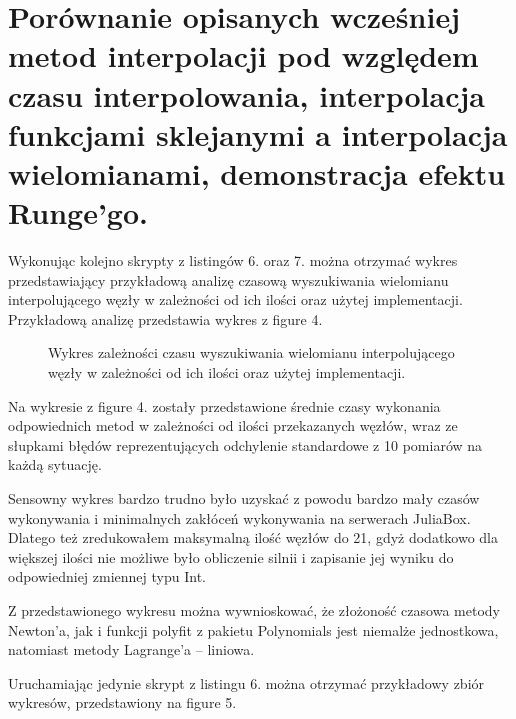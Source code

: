 \documentclass[a4paper,oneside,11pt]{report}
\begin{document}
\section{Porównanie opisanych wcześniej metod interpolacji pod względem czasu interpolowania, interpolacja funkcjami sklejanymi a interpolacja wielomianami, demonstracja efektu Runge'go.}





Wykonując kolejno skrypty z listingów 6. oraz 7. można otrzymać wykres przedstawiający przykładową analizę czasową wyszukiwania wielomianu interpolującego węzły w zależności od ich ilości oraz użytej implementacji. Przykładową analizę przedstawia wykres z figure 4.
\begin{figure}[htp] 
\caption{Wykres zależności czasu wyszukiwania wielomianu interpolującego węzły w zależności od ich ilości oraz użytej implementacji.}
\end{figure}
\newpage
Na wykresie z figure 4. zostały przedstawione średnie czasy wykonania odpowiednich metod w zależności od ilości przekazanych węzłów, wraz ze słupkami błędów reprezentujących odchylenie standardowe z 10 pomiarów na każdą sytuację.

Sensowny wykres bardzo trudno było uzyskać z powodu bardzo mały czasów wykonywania i minimalnych zakłóceń wykonywania na serwerach JuliaBox. Dlatego też zredukowałem maksymalną ilość węzłów do 21, gdyż dodatkowo dla większej ilości nie możliwe było obliczenie silnii i zapisanie jej wyniku do odpowiedniej zmiennej typu Int.

Z przedstawionego wykresu można wywnioskować, że złożoność czasowa metody Newton’a, jak i funkcji polyfit z pakietu Polynomials jest niemalże jednostkowa, natomiast metody Lagrange’a – liniowa.

Uruchamiając jedynie skrypt z listingu 6. można otrzymać przykładowy zbiór wykresów, przedstawiony na figure 5.
\end{document}
